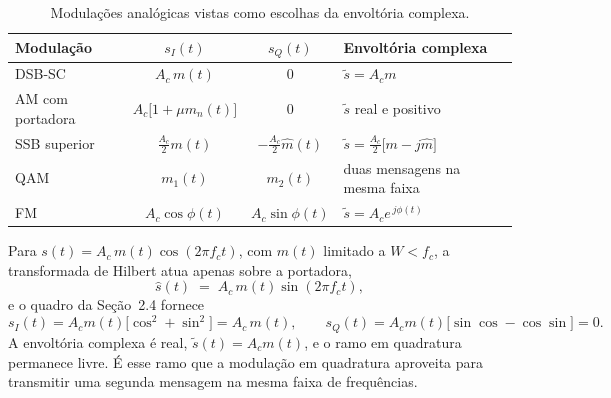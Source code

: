 \documentclass[11pt,a4paper]{article}
\begin{document}
\begin{table}[H]
\centering
\small
\begin{tabular}{@{}lccl@{}}
\toprule
\textbf{Modulação} & $s_I(t)$ & $s_Q(t)$ & \textbf{Envoltória complexa} \\
\midrule
DSB-SC          & $A_c\,m(t)$              & $0$                       & $\tilde{s} = A_c m$ \\
AM com portadora & $A_c\bigl[1+\mu m_n(t)\bigr]$ & $0$                  & $\tilde{s}$ real e positivo \\
SSB superior    & $\tfrac{A_c}{2}m(t)$     & $-\tfrac{A_c}{2}\hat{m}(t)$ & $\tilde{s} = \tfrac{A_c}{2}\bigl[m - j\hat{m}\bigr]$ \\
QAM             & $m_1(t)$                 & $m_2(t)$                  & duas mensagens na mesma faixa \\
FM              & $A_c\cos\phi(t)$         & $A_c\sin\phi(t)$          & $\tilde{s} = A_c e^{\,j\phi(t)}$ \\
\bottomrule
\end{tabular}
\caption{Modulações analógicas vistas como escolhas da envoltória complexa.}
\label{tab:casos}
\end{table}

\begin{exemplo}[DSB-SC]
Para $s(t) = A_c\,m(t)\cos(2\pi f_c t)$, com $m(t)$ limitado a $W < f_c$, a transformada de Hilbert atua apenas sobre a portadora,
\[
  \hat{s}(t) \;=\; A_c\,m(t)\sin(2\pi f_c t),
\]
e o quadro da Seção~2.4 fornece
\[
  s_I(t) = A_c m(t)\bigl[\cos^{2} + \sin^{2}\bigr] = A_c\,m(t),
  \qquad
  s_Q(t) = A_c m(t)\bigl[\sin\cos - \cos\sin\bigr] = 0 .
\]
A envoltória complexa é real, $\tilde{s}(t) = A_c m(t)$, e o ramo em quadratura permanece livre. É esse ramo que a modulação em quadratura aproveita para transmitir uma segunda mensagem na mesma faixa de frequências.
\end{exemplo}
\end{document}
